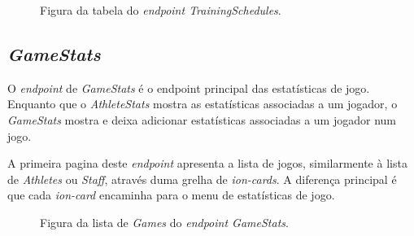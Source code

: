 \begin{figure}[h]
	\begin{center}
	\end{center}
	\caption{Figura da tabela do \textit{endpoint TrainingSchedules}.}\label{fig:athleteprofile}
\end{figure}
\newpage

\subsection{\textit{GameStats}}\label{subsec427}
O \textit{endpoint} de \textit{GameStats} é o endpoint principal das estatísticas de jogo. Enquanto que o \textit{AthleteStats} mostra as estatísticas associadas a um jogador, o \textit{GameStats} mostra e deixa adicionar estatísticas associadas a um jogador num jogo.

A primeira pagina deste \textit{endpoint} apresenta a lista de jogos, similarmente à lista de \textit{Athletes} ou \textit{Staff}, através duma grelha de \textit{ion-cards}. A diferença principal é que cada \textit{ion-card} encaminha para o menu de estatísticas de jogo. 

\begin{figure}[h]
	\begin{center}
	\end{center}
	\caption{Figura da lista de \textit{Games} do \textit{endpoint GameStats}.}\label{fig:gamestatslist}
\end{figure}

